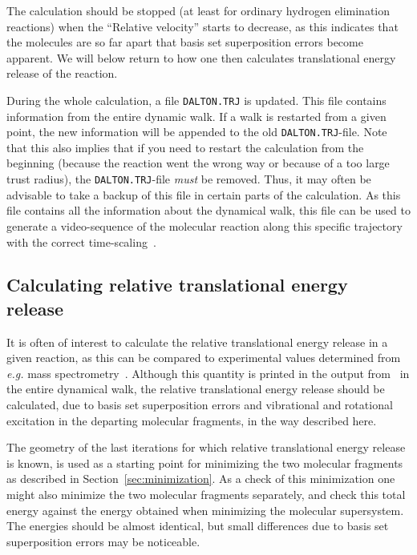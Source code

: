 The calculation should be stopped (at least for ordinary hydrogen
elimination reactions) when the ``Relative velocity'' starts to
decrease, as this indicates that the molecules are so far apart that
basis set superposition errors
become apparent. We will below return to how
one then calculates translational energy release of the reaction.

During the whole calculation, a file
\texttt{DALTON.TRJ} is updated. This
file contains information from the entire dynamic walk. If a
walk is restarted from a given point, the new information will be
appended to the old \texttt{DALTON.TRJ}-file. Note that this also implies
that if you need to restart the calculation from the beginning
(because the reaction went the wrong way or because of a too large trust
radius), the
\texttt{DALTON.TRJ}-file {\em must} be removed. Thus, it may often be
advisable to take a backup of this file in certain parts of the
calculation. As this file contains all the information about the
dynamical walk, this file can be used to generate a video-sequence of
the molecular reaction along this specific trajectory with the correct
time-scaling~\cite{krtheujms393}.

\subsection{Calculating relative translational energy release}

It is often of interest to calculate the relative translational energy
release in a given reaction, as this can be compared to experimental
values determined from {\it e.g.\/} mass
spectrometry~\cite{theuhjajcpl173}. Although
this quantity
is printed in the output from \dalton\ in the entire dynamical walk, the
relative translational energy release should be calculated, due to
basis set superposition errors
and vibrational and rotational
excitation in the departing molecular
fragments, in the way described here.

The geometry of the last iterations for which relative translational
energy release is known, is used as a starting point for minimizing
the two molecular fragments as described in
Section~\ref{sec:minimization}. As a check of this minimization one
might also minimize the two molecular fragments separately, and check
this total energy against the energy obtained when minimizing the
molecular supersystem. The energies should be almost identical, but
small differences due to basis set superposition errors may be
noticeable.


